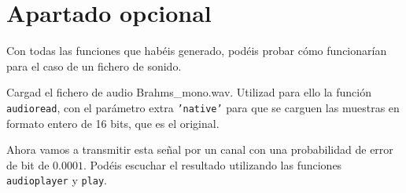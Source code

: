 \documentclass[es,practica]{uah}
\begin{document}
\section{Apartado opcional}

Con todas las funciones que habéis generado, podéis probar cómo funcionarían para el caso de un fichero de sonido. 

Cargad el fichero de audio Brahms\_mono.wav. Utilizad para ello la función \texttt{audioread}, con el parámetro extra \texttt{'native'} para que se carguen las muestras en formato entero de 16 bits, que es el original.

Ahora vamos a transmitir esta señal por un canal con una probabilidad de error de bit de $0.0001$. Podéis escuchar el resultado utilizando las funciones \texttt{audioplayer} y \texttt{play}. 
\end{document}
